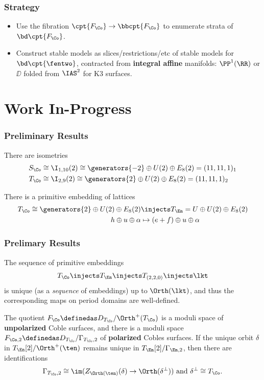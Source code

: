 \documentclass{beamer}
\begin{document}
{%
\begin{frame}\frametitle{Strategy}
{\small
\begin{itemize}
\item Use the fibration $\cpt{F_{\Co}} \to \bbcpt{F_{\Co}}$ to enumerate strata of $\bd \cpt{F_{\Co}}$.
\item Construct stable models as slices/restrictions/etc of stable models for $\bd \cpt{\fentwo}$, contracted from \textbf{integral affine} manifolds: $\PP^1(\RR)$ or $\DD$ folded from $\IAS^2$ for K3 surfaces.
\end{itemize}
}
\end{frame}
\section{Work In-Progress}
\begin{frame}\frametitle{Preliminary Results}
\begin{theorem}
There are isometries
\begin{align*}
S_{\Co} &\cong \I_{1, 10}(2) \cong \generators{-2} \oplus U(2) \oplus E_8(2) = (11,11,1)_1 \\
T_{\Co} &\cong \I_{2, 9}(2) \cong \generators{2} \oplus U(2) \oplus E_8(2) = (11,11,1)_2
\end{align*}
\end{theorem}
\begin{theorem}
There is a primitive embedding of lattices
\begin{align*}
T_{\Co} \cong \generators{2} \oplus U(2) \oplus E_8(2) &\injects T_{\En} = U \oplus U(2) \oplus E_8(2) \\
h \oplus u \oplus \alpha &\mapsto (e+f) \oplus u \oplus \alpha
\end{align*}
\end{theorem}
\end{frame}
\begin{frame}\frametitle{Prelimary Results}
{\small
\begin{theorem}
The sequence of primitive embeddings
\begin{align*}
T_{\Co} \injects T_{\En} \injects T_{(2,2,0)} \injects \lkt
\end{align*}
is unique (as a \textit{sequence} of embeddings) up to $\Orth(\lkt)$, and thus the corresponding maps on period domains are well-defined.
\end{theorem}
\begin{theorem}
The quotient $F_{\Co} \definedas D_{T_\Co} / \Orth^+(T_\Co)$ is a moduli space of \textbf{unpolarized} Coble surfaces, and there is a moduli space $F_{\Co, 2} \definedas D_{T_{\Co}}/\Gamma_{T_{\Co}, 2}$ of \textbf{polarized} Cobles surfaces.
If the unique orbit $\delta$ in $T_{\En}[2]/\Orth^+(\ten)$ remains unique in $T_{\En}[2]/\Gamma_{\En, 2}$, then there are identifications
\[
\Gamma_{T_{\Co}, 2} \cong \im( Z_{\Orth(\ten)} (\delta) \to \Orth(\delta^\perp) ) \text{ and } \delta^\perp \cong T_{\Co}
.\]
\end{theorem}
}


\end{frame}}
\end{document}
